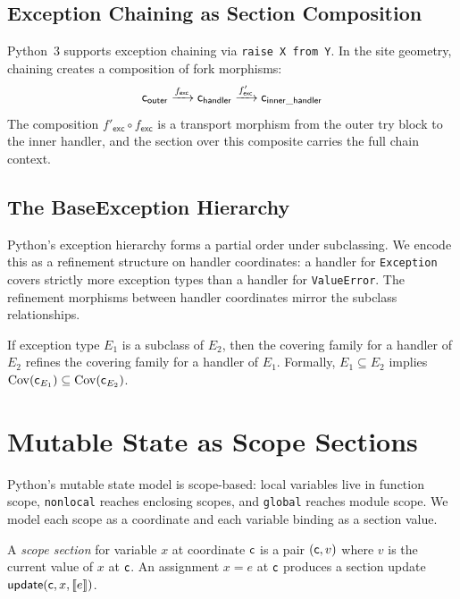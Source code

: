 \documentclass[11pt]{article}
\newcommand{\sectup}{\mathsf{update}}    %
\begin{document}
\subsection{Exception Chaining as Section Composition}

Python~3 supports exception chaining via \texttt{raise X from Y}.
In the site geometry, chaining creates a composition of fork morphisms:
\[
  \mathsf{c}_{\mathsf{outer}} \xrightarrow{f_{\mathsf{exc}}}
  \mathsf{c}_{\mathsf{handler}} \xrightarrow{f'_{\mathsf{exc}}}
  \mathsf{c}_{\mathsf{inner\_handler}}
\]
The composition $f'_{\mathsf{exc}} \circ f_{\mathsf{exc}}$ is a
transport morphism from the outer try block to the inner handler,
and the section over this composite carries the full chain context.

\subsection{The BaseException Hierarchy}

Python's exception hierarchy forms a partial order under subclassing.
We encode this as a refinement structure on handler coordinates:
a handler for \texttt{Exception} covers strictly more exception types
than a handler for \texttt{ValueError}.  The refinement morphisms
between handler coordinates mirror the subclass relationships.

\begin{lemma}\label{lem:handler-mono}
If exception type $E_1$ is a subclass of $E_2$, then the covering
family for a handler of $E_2$ refines the covering family for a
handler of $E_1$.  Formally, $E_1 \subseteq E_2$ implies
$\mathrm{Cov}(\mathsf{c}_{E_1}) \subseteq \mathrm{Cov}(\mathsf{c}_{E_2})$.
\end{lemma}

\section{Mutable State as Scope Sections}\label{sec:state}

Python's mutable state model is scope-based: local variables live in
function scope, \texttt{nonlocal} reaches enclosing scopes, and
\texttt{global} reaches module scope.  We model each scope as a
coordinate and each variable binding as a section value.

\begin{definition}\label{def:scope-section}
A \emph{scope section} for variable $x$ at coordinate $\mathsf{c}$ is a
pair $(\mathsf{c}, v)$ where $v$ is the current value of $x$ at $\mathsf{c}$.
An assignment $x = e$ at $\mathsf{c}$ produces a section update
$\sectup(\coord, x, \llbracket e \rrbracket)$.
\end{definition}
\end{document}
